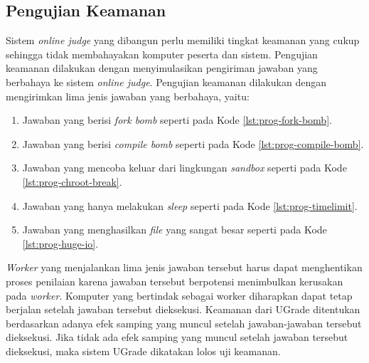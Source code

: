 \subsection{Pengujian Keamanan}
\par Sistem \textit{online judge} yang dibangun perlu memiliki tingkat keamanan yang cukup sehingga tidak membahayakan komputer peserta dan sistem. Pengujian keamanan dilakukan dengan menyimulasikan pengiriman jawaban yang berbahaya ke sistem \textit{online judge}. Pengujian keamanan dilakukan dengan mengirimkan lima jenis jawaban yang berbahaya, yaitu:
\begin{enumerate}
    
    \item Jawaban yang berisi \textit{fork bomb} seperti pada Kode \ref{lst:prog-fork-bomb}.
    
    \item Jawaban yang berisi \textit{compile bomb} seperti pada Kode \ref{lst:prog-compile-bomb}.
    
    \item Jawaban yang mencoba keluar dari lingkungan \textit{sandbox} seperti pada Kode \ref{lst:prog-chroot-break}.
    
    \item Jawaban yang hanya melakukan \textit{sleep} seperti pada Kode \ref{lst:prog-timelimit}.
    
    \item Jawaban yang menghasilkan \textit{file} yang sangat besar seperti pada Kode \ref{lst:prog-huge-io}.
\end{enumerate} 
\textit{Worker} yang menjalankan lima jenis jawaban tersebut harus dapat menghentikan proses penilaian karena jawaban tersebut berpotensi menimbulkan kerusakan pada \textit{worker}. Komputer yang bertindak sebagai worker diharapkan dapat tetap berjalan setelah jawaban tersebut dieksekusi. Keamanan dari UGrade ditentukan berdasarkan adanya efek samping yang muncul setelah jawaban-jawaban tersebut dieksekusi. Jika tidak ada efek samping yang muncul setelah jawaban tersebut dieksekusi, maka sistem UGrade dikatakan lolos uji keamanan. 

